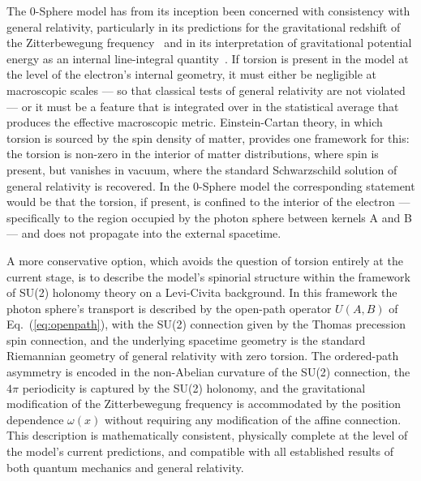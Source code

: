 \documentclass[%
 reprint,
 amsmath,amssymb,
 aps,
 prb,
]{revtex4-2}
\numberwithin{equation}{section}
\newcommand{\omeff}{\omega(x)}
\newcommand{\UAB}{U(A,B)}
\begin{document}
The 0-Sphere model has from its inception been concerned with consistency with general relativity, particularly in its predictions for the gravitational redshift of the Zitterbewegung frequency~\cite{paper22} and in its interpretation of gravitational potential energy as an internal line-integral quantity~\cite{paper37}. If torsion is present in the model at the level of the electron's internal geometry, it must either be negligible at macroscopic scales --- so that classical tests of general relativity are not violated --- or it must be a feature that is integrated over in the statistical average that produces the effective macroscopic metric. Einstein-Cartan theory, in which torsion is sourced by the spin density of matter, provides one framework for this: the torsion is non-zero in the interior of matter distributions, where spin is present, but vanishes in vacuum, where the standard Schwarzschild solution of general relativity is recovered. In the 0-Sphere model the corresponding statement would be that the torsion, if present, is confined to the interior of the electron --- specifically to the region occupied by the photon sphere between kernels A and B --- and does not propagate into the external spacetime.

A more conservative option, which avoids the question of torsion entirely at the current stage, is to describe the model's spinorial structure within the framework of SU(2) holonomy theory on a Levi-Civita background. In this framework the photon sphere's transport is described by the open-path operator $\UAB$ of Eq.~(\ref{eq:openpath}), with the SU(2) connection given by the Thomas precession spin connection, and the underlying spacetime geometry is the standard Riemannian geometry of general relativity with zero torsion. The ordered-path asymmetry is encoded in the non-Abelian curvature of the SU(2) connection, the $4\pi$ periodicity is captured by the SU(2) holonomy, and the gravitational modification of the Zitterbewegung frequency is accommodated by the position dependence $\omeff$ without requiring any modification of the affine connection. This description is mathematically consistent, physically complete at the level of the model's current predictions, and compatible with all established results of both quantum mechanics and general relativity.
\end{document}
